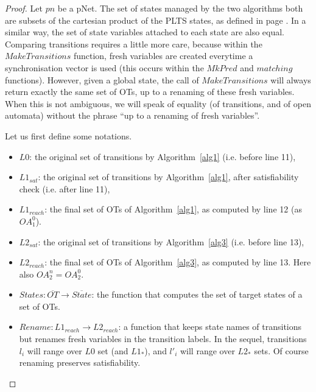 \documentclass[smallcondensed]{svjour3}
\begin{document}
\begin{proof} %

 Let $pn$ be a pNet. The set of states 
 managed by the two algorithms both are subsets of the cartesian
 product of the PLTS states, as defined in page \pageref{def-states}. In a
 similar way, the set of state variables attached to each state are
 also equal. Comparing  
 transitions requires a little more care, because within the
 $MakeTransitions$ function, fresh variables are created everytime a
 synchronisation vector is used (this occurs within the $MkPred$ and
 $matching$ functions). However, given a global state, the call of
 $MakeTransitions$ will always return exactly the same set of OTs, up to a
renaming of these fresh variables. When this is not ambiguous, we will
speak of equality (of transitions, and of open automata) without the phrase ``up to a renaming of fresh variables''.

  Let us first define some notations.
 \begin{itemize}
    \item $L0$: the original set of transitions by Algorithm~\ref{alg1}
      (i.e. before line 11), 
    \item $L1_{sat}$:  the original set of transitions by Algorithm~\ref{alg1}, after
      satisfiability check (i.e. after line 11),
    \item $L1_{reach}$: the final set of OTs of Algorithm~\ref{alg1}, as computed
      by line 12 (as $OA_1^0$). 
    \item $L2_{sat}$: the original set of transitions by Algorithm~\ref{alg3}
      (i.e. before line 13), 
    \item $L2_{reach}$: the final set of OTs of Algorithm~\ref{alg3}, as computed
          by line 13. Here also $OA_2^n = OA_2^0$.
   \item $States: \overline{OT}\rightarrow\overline{State}$:  the function that
computes the set of target states of a set of OTs.  
  \item $Rename:  L1_{reach} \rightarrow L2_{reach}$:  a function that
    keeps state names of transitions but renames fresh variables in
    the transition labels. In the sequel, transitions $l_i$ will range
    over $L0$ set (and $L1_*$), and $l'_i$ will range over $L2_*$
    sets. Of course renaming preserves satisfiability.
\end{itemize}


\end{proof}
\end{document}
